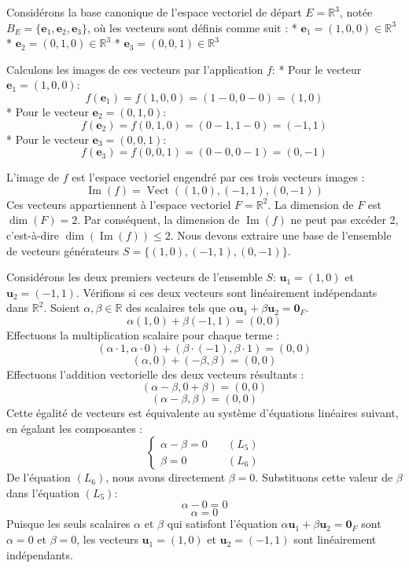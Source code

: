 \documentclass{report}
\begin{document}
Considérons la base canonique de l'espace vectoriel de départ $E = \mathbb{R}^3$, notée $B_E = \{ \mathbf{e}_1, \mathbf{e}_2, \mathbf{e}_3 \}$, où les vecteurs sont définis comme suit :
*   $\mathbf{e}_1 = (1,0,0) \in \mathbb{R}^3$
*   $\mathbf{e}_2 = (0,1,0) \in \mathbb{R}^3$
*   $\mathbf{e}_3 = (0,0,1) \in \mathbb{R}^3$

Calculons les images de ces vecteurs par l'application $f$:
*   Pour le vecteur $\mathbf{e}_1 = (1,0,0)$:
    $$ f(\mathbf{e}_1) = f(1,0,0) = (1-0, 0-0) = (1,0) $$
*   Pour le vecteur $\mathbf{e}_2 = (0,1,0)$:
    $$ f(\mathbf{e}_2) = f(0,1,0) = (0-1, 1-0) = (-1,1) $$
*   Pour le vecteur $\mathbf{e}_3 = (0,0,1)$:
    $$ f(\mathbf{e}_3) = f(0,0,1) = (0-0, 0-1) = (0,-1) $$

L'image de $f$ est l'espace vectoriel engendré par ces trois vecteurs images :
$$ \operatorname{Im}(f) = \operatorname{Vect}((1,0), (-1,1), (0,-1)) $$
Ces vecteurs appartiennent à l'espace vectoriel $F = \mathbb{R}^2$. La dimension de $F$ est $\dim(F) = 2$. Par conséquent, la dimension de $\operatorname{Im}(f)$ ne peut pas excéder 2, c'est-à-dire $\dim(\operatorname{Im}(f)) \le 2$.
Nous devons extraire une base de l'ensemble de vecteurs générateurs $S = \{ (1,0), (-1,1), (0,-1) \}$.

Considérons les deux premiers vecteurs de l'ensemble $S$: $\mathbf{u}_1 = (1,0)$ et $\mathbf{u}_2 = (-1,1)$.
Vérifions si ces deux vecteurs sont linéairement indépendants dans $\mathbb{R}^2$.
Soient $\alpha, \beta \in \mathbb{R}$ des scalaires tels que $\alpha \mathbf{u}_1 + \beta \mathbf{u}_2 = \mathbf{0}_F$.
$$ \alpha(1,0) + \beta(-1,1) = (0,0) $$
Effectuons la multiplication scalaire pour chaque terme :
$$ (\alpha \cdot 1, \alpha \cdot 0) + (\beta \cdot (-1), \beta \cdot 1) = (0,0) $$
$$ (\alpha, 0) + (-\beta, \beta) = (0,0) $$
Effectuons l'addition vectorielle des deux vecteurs résultants :
$$ (\alpha - \beta, 0 + \beta) = (0,0) $$
$$ (\alpha - \beta, \beta) = (0,0) $$
Cette égalité de vecteurs est équivalente au système d'équations linéaires suivant, en égalant les composantes :
$$ \begin{cases} \alpha - \beta = 0 & \quad (L_5) \\ \beta = 0 & \quad (L_6) \end{cases} $$
De l'équation $(L_6)$, nous avons directement $\beta = 0$.
Substituons cette valeur de $\beta$ dans l'équation $(L_5)$:
$$ \alpha - 0 = 0 $$
$$ \alpha = 0 $$
Puisque les seuls scalaires $\alpha$ et $\beta$ qui satisfont l'équation $\alpha \mathbf{u}_1 + \beta \mathbf{u}_2 = \mathbf{0}_F$ sont $\alpha = 0$ et $\beta = 0$, les vecteurs $\mathbf{u}_1 = (1,0)$ et $\mathbf{u}_2 = (-1,1)$ sont linéairement indépendants.
\end{document}
